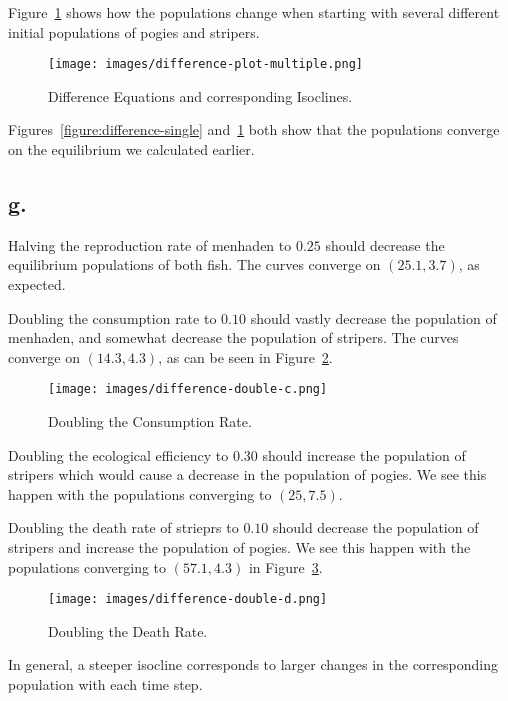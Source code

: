 Figure~\ref{figure:difference-multiple} shows how the populations change when starting with several different initial populations of pogies and stripers.

\begin{figure}[ht!]
    \centering
    \texttt{[image: images/difference-plot-multiple.png]}
    \caption{Difference Equations and corresponding Isoclines.}
    \label{figure:difference-multiple}
\end{figure}

Figures~\ref{figure:difference-single} and~\ref{figure:difference-multiple} both show that the populations converge on the equilibrium we calculated earlier.


\subsection*{g.}

Halving the reproduction rate of menhaden to $0.25$ should decrease the equilibrium populations of both fish.
The curves converge on $(25.1, 3.7)$, as expected.

Doubling the consumption rate to $0.10$ should vastly decrease the population of menhaden, and somewhat decrease the population of stripers.
The curves converge on $(14.3, 4.3)$, as can be seen in Figure~\ref{figure:difference-double-c}.

\begin{figure}[ht!]
    \centering
    \texttt{[image: images/difference-double-c.png]}
    \caption{Doubling the Consumption Rate.}
    \label{figure:difference-double-c}
\end{figure}

Doubling the ecological efficiency to $0.30$ should increase the population of stripers which would cause a decrease in the population of pogies.
We see this happen with the populations converging to $(25, 7.5)$.

Doubling the death rate of strieprs to $0.10$ should decrease the population of stripers and increase the population of pogies.
We see this happen with the populations converging to $(57.1, 4.3)$ in Figure~\ref{figure:difference-double-d}.

\begin{figure}[ht!]
    \centering
    \texttt{[image: images/difference-double-d.png]}
    \caption{Doubling the Death Rate.}
    \label{figure:difference-double-d}
\end{figure}

In general, a steeper isocline corresponds to larger changes in the corresponding population with each time step.
